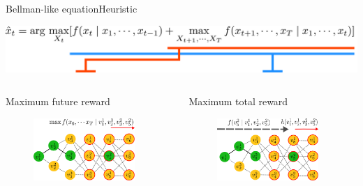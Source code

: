 \begin{frame}{Bellman-like equation}{Heuristic}


\centering
\includegraphics[width = \textwidth]{./figure/arg_equation}

\begin{columns}
\begin{block}{Maximum future reward}
\begin{figure}
\centering
\includegraphics[width = 0.9\textwidth]{./figure/DefineFuncH}
\end{figure}
\end{block}

\begin{block}{Maximum total reward}
\begin{figure}
\centering
\includegraphics[width = 0.9\textwidth]{./figure/DefineFuncP}
\end{figure}
\end{block}
\end{columns}


\end{frame}
